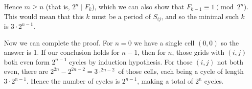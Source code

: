 \documentclass[11pt]{article}
\newcommand{\<}{\langle}
\renewcommand{\>}{\rangle}
\begin{document}
\begin{enumerate}
	Hence $m\ge n$ (that is, $2^n\mid F_k$), which we can also show that $F_{k-1}\equiv 1\pmod{2^n}$. 
	This would mean that this $k$ must be a period of $S_{ij}$, and so the minimal such $k$ is $3\cdot 2^{n-1}$. 
	
	Now we can complete the proof. For $n=0$ we have a single cell $(0, 0)$ so the answer is 1. 
	If our conclusion holds for $n-1$, then for $n$, those grids with $(i, j)$ both even form $2^{n-1}$ cycles by induction hypothesis. For those $(i, j)$ not both even, there are $2^{2n}-2^{2n-2}=3\cdot^{2n-2}$ of those cells, each being a cycle of length $3\cdot 2^{n-1}$. Hence the number of cycles is $2^{n-1}$, making a total of $2^n$ cycles. 
	
\end{enumerate}
	
	
\end{document}
